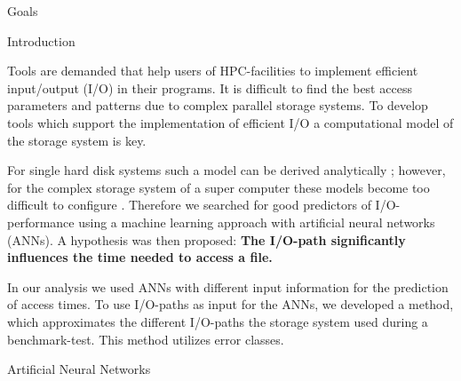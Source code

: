 \documentclass[final]{beamer}
\newlength{\onecolwid}
\begin{document}
\begin{frame}[t]
\begin{columns}[t]
\begin{column}{\onecolwid}
\begin{alertblock}{Goals}
\end{alertblock}


\begin{block}{Introduction}
	
Tools are demanded that help users of HPC-facilities to implement efficient input/output (I/O) in their programs.
It is difficult to find the best access parameters and patterns due to complex parallel storage systems.
To develop tools which support the implementation of efficient I/O a computational model of the storage system is key.\medskip

For single hard disk systems such a model can be derived analytically \cite{Ruemmler94anintroduction}; however, for the complex storage system of a super computer these models become too difficult to configure \cite{DBLP:conf/npc/ZhangLZJC10}.
Therefore we searched for good predictors of I/O-performance using a machine learning approach with artificial neural networks (ANNs).
A hypothesis was then proposed: \textbf{The I/O-path significantly influences the time needed to access a file.}\medskip

In our analysis we used ANNs with different input information for the prediction of access times.
To use I/O-paths as input for the ANNs, we developed a method, which approximates the different I/O-paths the storage system used during a benchmark-test.
This method utilizes error classes.

\end{block}




\begin{block}{Artificial Neural Networks}
		

\end{block}
\end{column}
\end{columns}
\end{frame}
\end{document}
